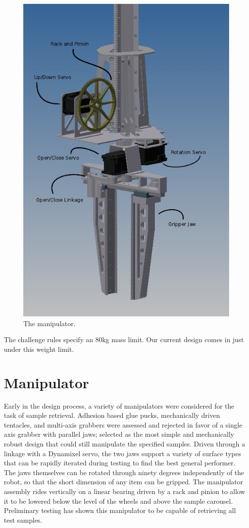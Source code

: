 \documentclass[12pt]{article}
\begin{document}
\begin{figure}[htbp]
\centering
\includegraphics[width=4.5in]{../assets/manipulator.jpg}
\caption{The manipulator.}
\label{fig_bot_manipulator}
\end{figure}

The challenge rules specify an 80kg mass limit. Our current design comes in
just under this weight limit.

%
\section{Manipulator}\label{Manipulator}

Early in the design process, a variety of manipulators were considered for the
task of sample retrieval. Adhesion based glue pucks, mechanically driven
tentacles, and multi-axis grabbers were assessed and rejected in favor of a
single axis grabber with parallel jaws; selected as the most simple and
mechanically robust design that could still manipulate the specified samples.
Driven through a linkage with a Dynamixel servo, the two jaws support a variety
of surface types that can be rapidly iterated during testing to find the best
general performer. The jaws themselves can be rotated through ninety degrees
independently of the robot, so that the short dimension of any item can be
gripped. The manipulator assembly rides vertically on a linear bearing driven
by a rack and pinion to allow it to be lowered below the level of the wheels
and above the sample carousel. Preliminary testing has shown this manipulator
to be capable of retrieving all test samples.
\end{document}

